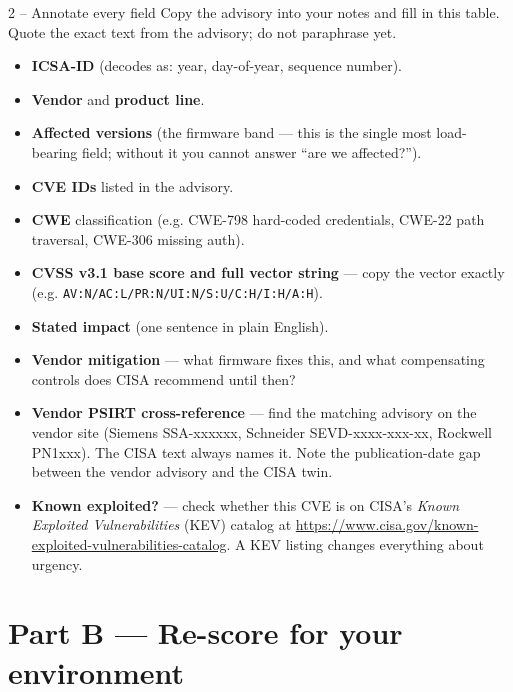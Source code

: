 \documentclass[11pt,a4paper]{article}
\begin{document}
\begin{stepbox}{2 -- Annotate every field}
Copy the advisory into your notes and fill in this table. Quote the exact text from the advisory; do not paraphrase yet.

\begin{itemize}\setlength{\itemsep}{1pt}
  \item \textbf{ICSA-ID} (decodes as: year, day-of-year, sequence number).
  \item \textbf{Vendor} and \textbf{product line}.
  \item \textbf{Affected versions} (the firmware band --- this is the single most load-bearing field; without it you cannot answer ``are we affected?'').
  \item \textbf{CVE IDs} listed in the advisory.
  \item \textbf{CWE} classification (e.g. CWE-798 hard-coded credentials, CWE-22 path traversal, CWE-306 missing auth).
  \item \textbf{CVSS v3.1 base score and full vector string} --- copy the vector exactly (e.g. \texttt{AV:N/AC:L/PR:N/UI:N/S:U/C:H/I:H/A:H}).
  \item \textbf{Stated impact} (one sentence in plain English).
  \item \textbf{Vendor mitigation} --- what firmware fixes this, and what compensating controls does CISA recommend until then?
  \item \textbf{Vendor PSIRT cross-reference} --- find the matching advisory on the vendor site (Siemens SSA-xxxxxx, Schneider SEVD-xxxx-xxx-xx, Rockwell PN1xxx). The CISA text always names it. Note the publication-date gap between the vendor advisory and the CISA twin.
  \item \textbf{Known exploited?} --- check whether this CVE is on CISA's \emph{Known Exploited Vulnerabilities} (KEV) catalog at \url{https://www.cisa.gov/known-exploited-vulnerabilities-catalog}. A KEV listing changes everything about urgency.
\end{itemize}
\end{stepbox}

\section*{Part B --- Re-score for your environment}
\end{document}
